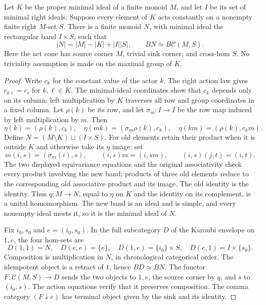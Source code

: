 \begin{theorem}
\label{CP2:A-constant-act-compression}
Let $K$ be the proper minimal ideal of a finite monoid $M$,
and let $I$ be its set of minimal right ideals. Suppose
every element of $K$ acts constantly on a nonempty finite
right $M$-set $S$. There is a finite monoid $N$, with
minimal ideal the rectangular band $I\times S$, such that
\[
 |N|=|M|-|K|+|I||S|,
 \qquad BN\simeq B\mathcal C(M,S).
\]
Here the act cone has source corner $M$, trivial sink
corner, and cross-hom $S$. No triviality assumption is
made on the maximal group of $K$.
\end{theorem}
\begin{proof}
Write $c_k$ for the constant value of the actor $k$.
The right action law gives $c_{k\ell}=c_\ell$ for
$k,\ell\in K$. The minimal-ideal coordinates show that
$c_k$ depends only on its column: left multiplication
by $K$ traverses all row and group coordinates in a
fixed column. Let $\rho(k)$ be its row, and let
$\sigma_m:I\to I$ be the row map induced by left
multiplication by $m$. Then
\[
 \eta(k)=(\rho(k),c_k),\quad
 \eta(mk)=(\sigma_m\rho(k),c_k),\quad
 \eta(km)=(\rho(k),c_km).
\]
Define $N=(M\setminus K)\sqcup(I\times S)$. For old
elements retain their product when it is outside $K$
and otherwise take its $\eta$ image; set
\[
 m(i,s)=(\sigma_m(i),s),\qquad
 (i,s)m=(i,sm),\qquad
 (i,s)(j,t)=(i,t).
\]
The two displayed equivariance equations and the original
associativity check every product involving the new band;
products of three old elements reduce to the corresponding
old associative product and its image. The old identity
is the identity. Thus $q:M\to N$, equal to $\eta$ on
$K$ and the identity on its complement, is a unital
homomorphism. The new band is an ideal and is simple,
and every nonempty ideal meets it, so it is the minimal
ideal of $N$.

Fix $i_0,s_0$ and $e=(i_0,s_0)$. In the full subcategory
$D$ of the Karoubi envelope on $1,e$, the four hom-sets are
\[
 D(1,1)=N,\quad D(e,e)=\{e\},\quad
 D(1,e)=\{i_0\}\times S,\quad
 D(e,1)=I\times\{s_0\}.
\]
Composition is multiplication in $N$, in chronological
categorical order. The idempotent object is a retract
of $1$, hence $BD\simeq BN$. The functor
$F:\mathcal C(M,S)\to D$ sends the two objects to
$1,e$, the source corner by $q$, and $s$ to $(i_0,s)$.
The action equations verify that it preserves composition.
The comma category $(F\downarrow e)$ has terminal
object given by the sink and its identity.


\end{proof}
